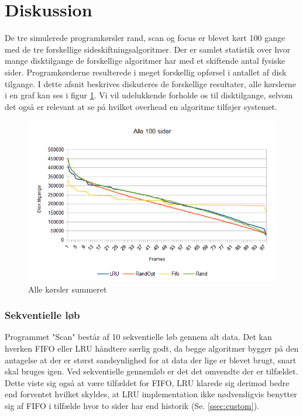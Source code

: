 \section{Diskussion}
De tre simulerede programkørsler rand, scan og focus er blevet kørt 100 gange med de tre forskellige sideskiftningsalgoritmer. Der er samlet statistik over hvor mange disktilgange de forskellige algoritmer har med et skiftende antal fysiske sider. Programkørslerne resulterede i meget forskellig opførsel i antallet af disk tilgange. I dette afsnit beskrives diskuteres de forskellige resultater, alle kørslerne i en graf kan ses i figur \ref{fig:all}. Vi vil udelukkende forholde os til disktilgange, selvom det også er relevant at se på hvilket overhead en algoritme tilføjer systemet.


\begin{figure}[ht]
\centerline{\includegraphics[scale=1]{graph/stat_all}}
\FloatBarrier
\caption{Alle kørsler summeret}
\label{fig:all}
\end{figure}

\subsubsection{Sekventielle løb}
Programmet "Scan" består af 10 sekventielle løb gennem alt data. Det kan hverken FIFO eller LRU håndtere særlig godt, da begge algoritmer bygger på den antagelse at der er størst sandsynlighed for at data der lige er blevet brugt, snart skal bruges igen. Ved sekventielle gennemløb er det det omvendte der er tilfældet. Dette viste sig også at være tilfældet for FIFO, LRU klarede sig derimod bedre end forventet hvilket skyldes, at LRU implementation ikke nødvendigvis benytter sig af FIFO i tilfælde hvor to sider har end historik (Se. \ref{ssec:custom}).


